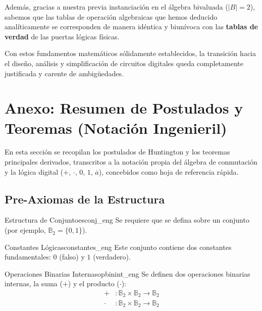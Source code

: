 \documentclass[12pt,a4paper]{article}
\begin{document}
Además, gracias a nuestra previa instanciación en el álgebra bivaluada ($|B|=2$), sabemos que las tablas de operación algebraicas que hemos deducido analíticamente se corresponden de manera idéntica y biunívoca con las \textbf{tablas de verdad} de las puertas lógicas físicas.

Con estos fundamentos matemáticos sólidamente establecidos, la transición hacia el diseño, análisis y simplificación de circuitos digitales queda completamente justificada y carente de ambigüedades.

\newpage
\section{Anexo: Resumen de Postulados y Teoremas (Notación Ingenieril)}
\makeatletter

En esta sección se recopilan los postulados de Huntington y los teoremas principales derivados, transcritos a la notación propia del álgebra de conmutación y la lógica digital ($+$, $\cdot$, $0$, $1$, $\overline{a}$), concebidos como hoja de referencia rápida.

\subsection*{Pre-Axiomas de la Estructura}

\setcounter{tcb@cnt@preaxioma}{0}
\begin{preaxioma}{Estructura de Conjunto}{esconj_eng}
Se requiere que se defina sobre un conjunto (por ejemplo, $\mathbb{B}_2 = \{0, 1\}$).
\end{preaxioma}

\setcounter{tcb@cnt@preaxioma}{1}
\begin{preaxioma}{Constantes Lógicas}{constantes_eng}
Este conjunto contiene dos constantes fundamentales: $0$ (falso) y $1$ (verdadero).
\end{preaxioma}

\setcounter{tcb@cnt@preaxioma}{2}
\begin{preaxioma}{Operaciones Binarias Internas}{opbinint_eng}
Se definen dos operaciones binarias internas, la suma ($+$) y el producto ($\cdot$):
\begin{align*}
+ &: \mathbb{B}_2 \times \mathbb{B}_2 \to \mathbb{B}_2 \\
\cdot &: \mathbb{B}_2 \times \mathbb{B}_2 \to \mathbb{B}_2
\end{align*}
\end{preaxioma}
\end{document}
